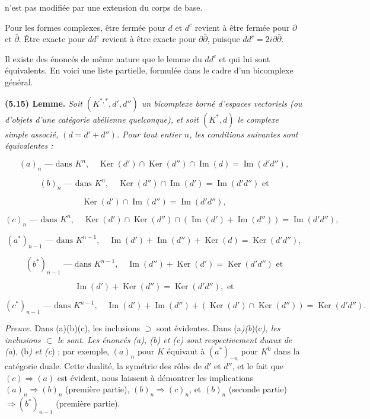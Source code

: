 \documentclass[
  french,
  a3paper,
  a3paper]{extarticle}
\begin{document}
n'est pas modifiée par une extension du corps de base.

Pour les formes complexes, être fermée pour \(d\) et \(d^c\) revient à
être fermée pour \(\partial\) et \(\bar\partial\). Être exacte pour
\(dd^c\) revient à être exacte pour \(\partial\bar\partial\), puisque
\(dd^c=2i\partial\bar\partial\).

Il existe des énoncés de même nature que le lemme du \(dd^c\) et qui lui
sont équivalents. En voici une liste partielle, formulée dans le cadre
d'un bicomplexe général.

\textbf{(5.15) Lemme.} \emph{Soit \((K^{*,*},d',d'')\) un bicomplexe
borné d'espaces vectoriels (ou d'objets d'une catégorie abélienne
quelconque), et soit \((K^*,d)\) le complexe simple associé,
\((d=d'+d'')\). Pour tout entier \(n\), les conditions suivantes sont
équivalentes :}

\[(a)_n\text{ — dans }K^n,\quad\operatorname{Ker}(d')\cap\operatorname{Ker}(d'')\cap\operatorname{Im}(d)=\operatorname{Im}(d'd''),\]

\[(b)_n\text{ — dans }K^n,\quad\operatorname{Ker}(d'')\cap\operatorname{Im}(d')=\operatorname{Im}(d'd'')\text{ et}\]

\[\operatorname{Ker}(d')\cap\operatorname{Im}(d'')=\operatorname{Im}(d'd''),\]

\[(c)_n\text{ — dans }K^n,\quad\operatorname{Ker}(d')\cap\operatorname{Ker}(d'')\cap(\operatorname{Im}(d')+\operatorname{Im}(d''))=\operatorname{Im}(d'd''),\]

\[(a^*)_{n-1}\text{ — dans }K^{n-1},\quad\operatorname{Im}(d')+\operatorname{Im}(d'')+\operatorname{Ker}(d)=\operatorname{Ker}(d'd''),\]

\[(b^*)_{n-1}\text{ — dans }K^{n-1},\quad\operatorname{Im}(d'')+\operatorname{Ker}(d')=\operatorname{Ker}(d'd'')\text{ et}\]

\[\operatorname{Im}(d')+\operatorname{Ker}(d'')=\operatorname{Ker}(d'd''),\text{ et}\]

\[(c^*)_{n-1}\text{ — dans }K^{n-1},\quad\operatorname{Im}(d')+\operatorname{Im}(d'')+(\operatorname{Ker}(d')\cap\operatorname{Ker}(d''))=\operatorname{Ker}(d'd'').\]

\emph{Preuve.} Dans (a)(b)(c), les inclusions \(\supset\) sont
évidentes. Dans (a\emph{)(b})(c\emph{), les inclusions \(\subset\) le
sont. Les énoncés (a), (b) et (c) sont respectivement duaux de (a}),
(b\emph{) et (c}) ; par exemple, \((a)_n\) pour \(K\) équivaut à
\((a^*)_{-n}\) pour \(K^0\) dans la catégorie duale. Cette dualité, la
symétrie des rôles de \(d'\) et \(d''\), et le fait que
\((c)\Rightarrow(a)\) est évident, nous laissent à démontrer les
implications \((a)_n\Rightarrow(b)_n\) (première partie),
\((b)_n\Rightarrow(c)_n\), et \((b)_n\) (seconde partie)
\(\Rightarrow(b^*)_{n-1}\) (première partie).
\end{document}
